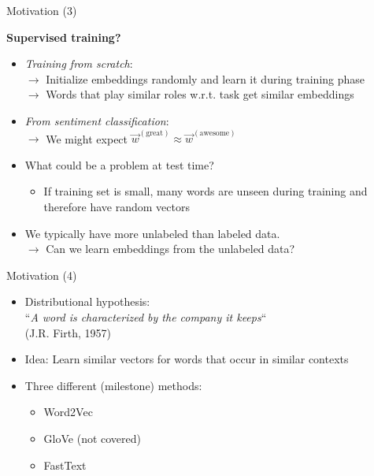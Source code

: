 \begin{vbframe}{Motivation (3)}

\vfill

\textbf{Supervised training?}

\begin{itemize}
	\item \textit{Training from scratch}:
	\\ $\rightarrow$ Initialize embeddings randomly and learn it during training phase
	\\ $\rightarrow$ Words that play similar roles w.r.t. task get similar embeddings
	\item \textit{From sentiment classification}: 
	\\ $\rightarrow$ We might expect $\vec w^{(\text{great})} \approx \vec w^{(\text{awesome})}$
	\item \ques What could be a problem at test time?
	\begin{itemize}
		\item If training set is small, many words are unseen during training and therefore have random vectors
	\end{itemize}
	\item We typically have more unlabeled than labeled data.
	\\ $\rightarrow$ Can we learn embeddings from the unlabeled data?
\end{itemize}

\vfill

\end{vbframe}


\begin{vbframe}{Motivation (4)}

\vfill

\begin{itemize}
	\item Distributional hypothesis: 
	\\ {\centering ``\textit{A word is characterized by the company it keeps}``}
	\\ {\centering (J.R. Firth, 1957)}
	\item Idea: Learn similar vectors for words that occur in similar contexts
	\item Three different (milestone) methods:
		\begin{itemize}
			\item Word2Vec 
			\item GloVe (not covered) 
			\item FastText 
		\end{itemize}
\end{itemize}

\vfill

\end{vbframe}

